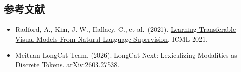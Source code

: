 \hypertarget{ux53c2ux8003ux6587ux732e-76}{%
\subsection{参考文献}\label{ux53c2ux8003ux6587ux732e-76}}

\begin{itemize}
\tightlist
\item
  Radford, A., Kim, J. W., Hallacy, C., et al.~(2021). \href{https://arxiv.org/abs/2103.00020}{Learning Transferable Visual Models From Natural Language Supervision}. ICML 2021.
\item
  Meituan LongCat Team. (2026). \href{https://arxiv.org/abs/2603.27538}{LongCat-Next: Lexicalizing Modalities as Discrete Tokens}. arXiv:2603.27538.
\end{itemize}

\clearpage
